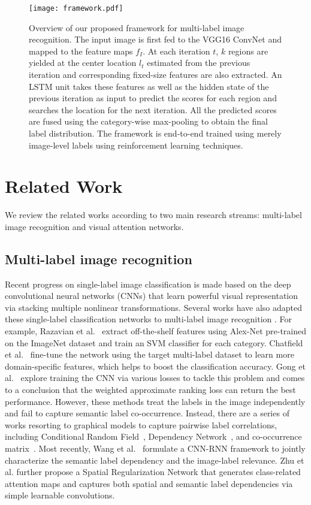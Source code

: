 \documentclass[letterpaper]{article} %
\begin{document}
\begin{figure*}[!t]
   \centering
   \texttt{[image: framework.pdf]}
   \caption{Overview of our proposed framework for multi-label image recognition. The input image is first fed to the VGG16 ConvNet and mapped to the feature maps $f_I$. At each iteration $t$, $k$ regions are yielded at the center location $l_t$ estimated from the previous iteration and corresponding fixed-size features are also extracted. An LSTM unit takes these features as well as the hidden state of the previous iteration as input to predict the scores for each region and searches the location for the next iteration. All the predicted scores are fused using the category-wise max-pooling to obtain the final label distribution. The framework is end-to-end trained using merely image-level labels using reinforcement learning techniques.}
   \label{fig:framework}
\end{figure*}
\section{Related Work}
We review the related works according to two main research streams: multi-label image recognition and visual attention networks.

\subsection{Multi-label image recognition}
Recent progress on single-label image classification is made based on the deep convolutional neural networks (CNNs)\cite{krizhevsky2012imagenet,simonyan2014very,he2016deep} that learn powerful visual representation via stacking multiple nonlinear transformations. Several works have also adapted these single-label classification networks to multi-label image recognition \cite{sharif2014cnn,simonyan2014very,yang2016exploit,wei2016hcp,wang2016cnn}. For example, Razavian et al.~\cite{sharif2014cnn} extract off-the-shelf features using Alex-Net pre-trained on the ImageNet dataset and train an SVM classifier for each category. Chatfield et al.~\cite{chatfield2014return} fine-tune the network using the target multi-label dataset to learn more domain-specific features, which helps to boost the classification accuracy. Gong et al.~\cite{gong2013deep} explore training the CNN via various losses to tackle this problem and comes to a conclusion that the weighted approximate ranking loss can return the best performance. However, these methods treat the labels in the image independently and fail to capture semantic label co-occurrence. Instead, there are a series of works resorting to graphical models to capture pairwise label correlations, including Conditional Random Field~\cite{ghamrawi2005collective}, Dependency Network~\cite{guo2011multi}, and co-occurrence matrix~\cite{xue2011correlative}. Most recently, Wang et al.~\cite{wang2016cnn} formulate a CNN-RNN framework to jointly characterize the semantic label dependency and the image-label relevance. Zhu et al. \cite{zhu2017learning} further propose a Spatial Regularization Network that generates class-related attention maps and captures both spatial and semantic label dependencies via simple learnable convolutions.
\end{document}
